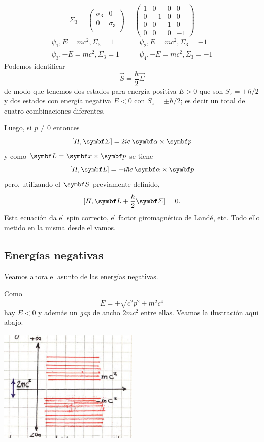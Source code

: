 \documentclass[10pt,oneside]{CBFT_book}
\begin{document}
\[
	\Sigma_3 =  \begin{pmatrix} \sigma_3 & 0 \\ 0 & \sigma_3 \\ \end{pmatrix} = 
	\begin{pmatrix} 1 & 0 & 0 & 0 \\ 0 & -1 & 0 & 0 \\ 0 & 0 & 1 & 0 \\ 0 & 0 & 0 & -1 \end{pmatrix}
\]
\begin{align*}
	\psi_1, E=mc^2, \Sigma_3=1 \qquad  &\psi_2, E=mc^2, \Sigma_3=-1 \\
	\psi_3, -E=mc^2, \Sigma_3=1 \qquad  &\psi_4, -E=mc^2, \Sigma_3=-1
\end{align*}
Podemos identificar 
\[
	\vec{S} = \frac{\hbar}{2} \vec{\Sigma}
\]
de modo que tenemos dos estados para energía positiva $ E > 0 $ que son $ S_z = \pm \hbar/2 $ y
dos estados con energía negativa $ E < 0 $ con $S_z = \pm \hbar / 2 $; es decir un total de cuatro
combinaciones diferentes.

Luego, si $p \neq 0$ entonces
\[
	[H, \vb{\Sigma}] = 2 i c \: \vb{\alpha} \times \vb{p}
\]
y como $\vb L = \vbx \times \vb p $ se tiene
\[
	[ H, \vb L] = - i \hbar c \: \vb{\alpha} \times \vb{p}
\]
pero, utilizando el $\vb S$ previamente definido,
\[
	[ H, \vb L + \frac{\hbar}{2}\vb{\Sigma} ] =  0.
\]
Esta ecuación da el spin correcto, el factor giromagnético de Landé, etc. Todo ello metido en la misma
desde el vamos.

\subsection{Energías negativas}

Veamos ahora el asunto de las energías negativas.

Como 
\[
	E = \pm  \sqrt{ c^2 p^2 + m^2 c^4 }
\]
hay $E<0$ y además un {\it gap} de ancho $2mc^2$ entre ellas. Veamos la ilustración aqui abajo.

\includegraphics[width=0.5\textwidth]{images/fig_ft2_energias_negativas_1.jpg}
\end{document}
